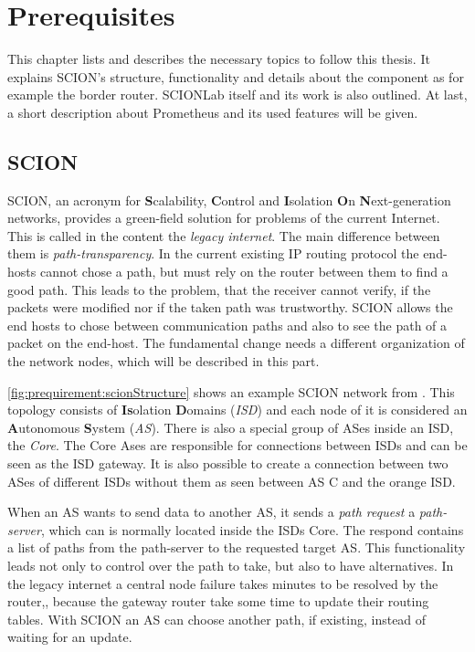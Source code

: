 \documentclass[thesis.tex]{subfiles}
\begin{document}
\chapter{Prerequisites}\label{chap:preq}

This chapter lists and describes the necessary topics to follow this thesis. It explains SCION's structure, functionality and details about the component as for example the border router. SCIONLab itself and its work is also outlined. At last, a short description about Prometheus and its used features will be given.

\section{SCION}

SCION, an acronym for \textbf{S}calability, \textbf{C}ontrol and \textbf{I}solation \textbf{O}n \textbf{N}ext-generation networks, provides a green-field solution for problems of the current Internet. This is called in the content the \textit{legacy internet}. The main difference between them is \textit{path-transparency}. In the current existing IP routing protocol the end-hosts cannot chose a path, but must rely on the router between them to find a good path. This leads to the problem, that the receiver cannot verify, if the packets were modified nor if the taken path was trustworthy. SCION allows the end hosts to chose between communication paths and also to see the path of a packet on the end-host. The fundamental change needs a different organization of the network nodes, which will be described in this part.

\autoref{fig:prequirement:scionStructure} shows an example SCION network from \cite{SCIONPaper}. This topology consists of \textbf{Is}olation \textbf{D}omains (\textit{ISD}) and each node of it is considered an \textbf{A}utonomous \textbf{S}ystem (\textit{AS}). There is also a special group of ASes inside an ISD, the \textit{Core}. The Core Ases are responsible for connections between ISDs and can be seen as the ISD gateway. It is also possible to create a connection between two ASes of different ISDs without them as seen between AS C and the orange ISD.

When an AS wants to send data to another AS, it sends a \textit{path request} a \textit{path-server}, which can is normally located inside the ISDs Core. The respond contains a list of paths from the path-server to the requested target AS. This functionality leads not only to control over the path to take, but also to have alternatives. In the legacy internet a central node failure takes minutes to be resolved by the router,, because the gateway router take some time to update their routing tables. With SCION an AS can choose another path, if existing, instead of waiting for an update.
\end{document}
